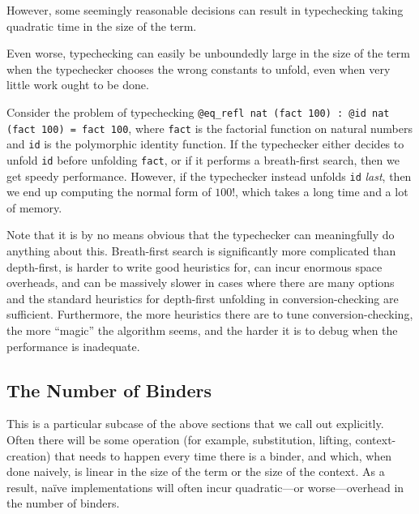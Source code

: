 However, some seemingly reasonable decisions can result in typechecking taking quadratic time in the size of the term.


Even worse, typechecking can easily be unboundedly large in the size of the term when the typechecker chooses the wrong constants to unfold, even when very little work ought to be done.


Consider the problem of typechecking \texttt{@eq\_refl nat (fact 100) : @id nat (fact 100) = fact 100}, where \texttt{fact} is the factorial function on natural numbers and \texttt{id} is the polymorphic identity function.
If the typechecker either decides to unfold \texttt{id} before unfolding \texttt{fact}, or if it performs a breath-first search, then we get speedy performance.
However, if the typechecker instead unfolds \texttt{id} \emph{last}, then we end up computing the normal form of $100!$, which takes a long time and a lot of memory.

Note that it is by no means obvious that the typechecker can meaningfully do anything about this.
Breath-first search is significantly more complicated than depth-first, is harder to write good heuristics for, can incur enormous space overheads, and can be massively slower in cases where there are many options and the standard heuristics for depth-first unfolding in conversion-checking are sufficient.
Furthermore, the more heuristics there are to tune conversion-checking, the more ``magic'' the algorithm seems, and the harder it is to debug when the performance is inadequate.


\subsection{The Number of Binders}

This is a particular subcase of the above sections that we call out explicitly.
Often there will be some operation (for example, substitution, lifting, context-creation) that needs to happen every time there is a binder, and which, when done naively, is linear in the size of the term or the size of the context.
As a result, na\"ive implementations will often incur quadratic---or worse---overhead in the number of binders.

